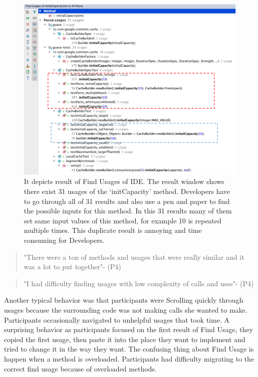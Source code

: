 \documentclass[conference]{IEEEtran}
\begin{document}
\begin{figure}
    \centering
    \includegraphics [width=\columnwidth,keepaspectratio, clip]{figures/Picture1}
    \caption{It depicts result of Find Usages of IDE. The result window shows there exist 31 usages of the ‘initCapacity’ method. Developers have to go through all of 31 results and also use a pen and paper to find the possible inputs for this method. In this 31 results many of them set same input values of this method, for example 10 is repeated multiple times. This duplicate result is annoying and time consuming for Developers. 
}
\label{fig:usege}
\end{figure}

\begin{quote}"There were a ton of methods and usages that were really similar and it was a lot to put together"- (P4)\end{quote}
\begin{quote}"I had difficulty finding usages with low complexity of calls and uses"- (P4)\end{quote}

Another typical behavior was that participants were Scrolling quickly through usages because the surrounding code was not making calls she wanted to make. Participants occasionally navigated to unhelpful usages that took time. A surprising behavior as participants focused on the first result of Find Usage, they copied the first usage, then paste it into the place they want to implement and tried to change it in the way they want. The confusing thing about Find Usage is happen when a method is overloaded. Participants had difficulty migrating to the correct find usage because of overloaded methods.
\end{document}
